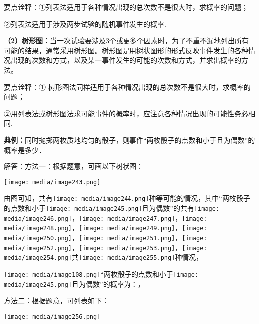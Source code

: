 \documentclass[a4paper,11pt,UTF8]{ctexart}
\begin{document}
要点诠释：①列表法适用于各种情况出现的总次数不是很大时，求概率的问题；

②列表法适用于涉及两步试验的随机事件发生的概率.

\textbf{（2）树形图：}当一次试验要涉及3个或更多个因素时，为了不重不漏地列出所有可能的结果，通常采用树形图。树形图是用树状图形的形式反映事件发生的各种情况出现的次数和方式，以及某一事件发生的可能的次数和方式，并求出概率的方法。

要点诠释：①
树形图法同样适用于各种情况出现的总次数不是很大时，求概率的问题；

②用列表法或树形图法求可能事件的概率时，应注意各种情况出现的可能性务必相同.

\textbf{典例：}同时抛掷两枚质地均匀的骰子，则事件``两枚骰子的点数和小于且为偶数''的概率是多少．

解答：方法一：根据题意，可画以下树状图：

\texttt{[image: media/image243.png]}

由图可知，共有\texttt{[image: media/image244.png]}种等可能的情况，其中``两枚骰子的点数和小于\texttt{[image: media/image245.png]}且为偶数''的共有\texttt{[image: media/image246.png]}，\texttt{[image: media/image247.png]}，\texttt{[image: media/image248.png]}，\texttt{[image: media/image249.png]}，\texttt{[image: media/image250.png]}，\texttt{[image: media/image251.png]}，\texttt{[image: media/image252.png]}，\texttt{[image: media/image253.png]}，\texttt{[image: media/image254.png]}共\texttt{[image: media/image255.png]}种情况，

\texttt{[image: media/image108.png]}``两枚骰子的点数和小于\texttt{[image: media/image245.png]}且为偶数''的概率为：，

方法二：根据题意，可列表如下：

\texttt{[image: media/image256.png]}
\end{document}

